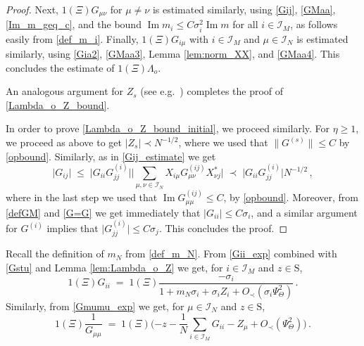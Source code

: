 \documentclass[11pt]{article} %
\newcommand{\nc}{\normalcolor}
\numberwithin{equation}{section}
\numberwithin{figure}{section}
\theoremstyle{plain} %
\theoremstyle{definition} %
\newcommand{\f}[1]{\boldsymbol{\mathrm{#1}}} %
\renewcommand{\cal}{\mathcal}
\renewcommand{\leq}{\leqslant}
\renewcommand{\geq}{\geqslant}
\newcommand{\ind}[1]{\f 1 (#1)}
\newcommand{\pBB}[1]{\Biggl({#1}\Biggr)}
\newcommand{\abs}[1]{\lvert #1 \rvert}
\newcommand{\absb}[1]{\bigl\lvert #1 \bigr\rvert}
\newcommand{\absBB}[1]{\Biggl\lvert #1 \Biggr\rvert}
\newcommand{\norm}[1]{\lVert #1 \rVert}
\DeclareMathOperator{\im}{Im}
\begin{document}
\begin{proof}
Next, $\ind{\Xi} G_{\mu \nu}$ for $\mu \neq \nu$ is estimated similarly, using \eqref{Gij}, \eqref{GMaa}, \eqref{Im_m_geq_c}, and the bound $\im m_i \leq C \sigma_i^2 \im m$
for all $i \in \cal I_M$, as follows easily from \eqref{def_m_i}. Finally, $\ind{\Xi} G_{i \mu}$ with $i \in \cal I_M$ and $\mu \in \cal I_N$ is estimated similarly, using \eqref{Gia2}, \eqref{GMaa3}, Lemma \ref{lem:norm_XX}, and \eqref{GMaa4}. This concludes the estimate of $\ind{\Xi} \Lambda_o$. 

An analogous argument for $Z_s$   (see e.g.\ \cite[Lemma 5.2]{EKYY4}) \nc completes the proof of \eqref{Lambda_o_Z_bound}.

In order to prove \eqref{Lambda_o_Z_bound_initial}, we proceed similarly. For $\eta \geq 1$, we proceed as above to get $\abs{Z_s} \prec N^{-1/2}$, where we used that $\norm{G^{(s)}} \leq C$ by \eqref{opbound}. Similarly, as in \eqref{Gij_estimate} we get
\begin{equation*}
\abs{G_{ij}} \;\leq\; \absb{G_{ii} G_{jj}^{(i)}} \absBB{\sum_{\mu,\nu \in \cal I_N}  X_{i \mu} G^{(ij)}_{\mu \nu} X^*_{\nu j}} \;\prec\; \absb{G_{ii} G_{jj}^{(i)}} N^{-1/2}\,,
\end{equation*}
where in the last step we used that $\im G_{\mu \mu}^{(ij)} \leq C$, by \eqref{opbound}. Moreover, from \eqref{defGM} and \eqref{G=G} we get immediately that $\abs{G_{ii}} \leq C \sigma_i$, and a similar argument for $G^{(i)}$ implies that $\abs{G_{jj}^{(i)}} \leq C \sigma_j$. This concludes the proof.
\end{proof}

Recall the definition of $m_N$ from \eqref{def_m_N}.
From \eqref{Gii_exp} combined with \eqref{Gstu} and Lemma \ref{lem:Lambda_o_Z} we get, for $i \in \cal I_M$ and $z \in \f S$,
\begin{equation} \label{Gii_2}
\ind{\Xi} G_{ii} \;=\; \ind{\Xi} \frac{-\sigma_i}{1 + m_N \sigma_i + \sigma_i Z_i + O_\prec(\sigma_i \Psi_\Theta^2)}\,.
\end{equation}
Similarly, from \eqref{Gmumu_exp} we get, for $\mu \in \cal I_N$ and $z \in \f S$,
\begin{equation} \label{Gmumu_2}
\ind{\Xi} \frac{1}{G_{\mu \mu}} \;=\; \ind{\Xi} \pBB{-z - \frac{1}{N} \sum_{i \in \cal I_M} G_{ii} - Z_\mu + O_\prec(\Psi_\Theta^2)}\,.
\end{equation}
\end{document}
